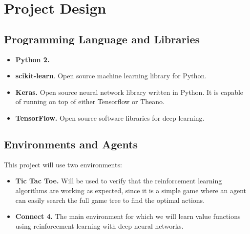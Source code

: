 \documentclass{article}
\begin{document}
\section{Project Design}
\label{sec:project-design}

\subsection{Programming Language and Libraries}

\begin{itemize}

    \item \textbf{Python 2.}

    \item \textbf{scikit-learn}. Open source machine learning library for Python.

    \item \textbf{Keras.} Open source neural network library written in Python. It is capable of
        running on top of either Tensorflow or Theano.

    \item \textbf{TensorFlow.} Open source software libraries for deep learning.

\end{itemize}

\subsection{Environments and Agents}

This project will use two environments:

\begin{itemize}

    \item \textbf{Tic Tac Toe.} Will be used to verify that the reinforcement learning algorithms
        are working as expected, since it is a simple game where an agent can easily search the full
        game tree to find the optimal actions.

    \item \textbf{Connect 4.} The main environment for which we will learn value functions using
        reinforcement learning with deep neural networks.

\end{itemize}
\end{document}
